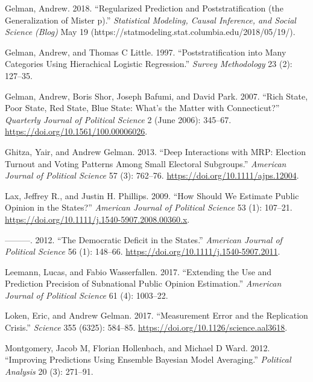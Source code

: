 \documentclass[
]{article}
\newlength{\cslhangindent}
\newenvironment{CSLReferences}[2] %
 {%
  \setlength{\parindent}{0pt}
  \ifodd #1 \everypar{\setlength{\hangindent}{\cslhangindent}}\ignorespaces\fi
  \ifnum #2 > 0
  \setlength{\parskip}{#2\baselineskip}
  \fi
 }%
 {}
\begin{document}
\begin{CSLReferences}{1}{0}
\leavevmode{}%
Gelman, Andrew. 2018. {``Regularized Prediction and Poststratification
(the Generalization of Mister p).''} \emph{Statistical Modeling, Causal
Inference, and Social Science (Blog)} May 19
(https://statmodeling.stat.columbia.edu/2018/05/19/).

\leavevmode{}%
Gelman, Andrew, and Thomas C Little. 1997. {``Poststratification into
Many Categories Using Hierachical Logistic Regression.''} \emph{Survey
Methodology} 23 (2): 127--35.

\leavevmode{}%
Gelman, Andrew, Boris Shor, Joseph Bafumi, and David Park. 2007. {``Rich
State, Poor State, Red State, Blue State: What's the Matter with
Connecticut?''} \emph{Quarterly Journal of Political Science} 2 (June
2006): 345--67. \url{https://doi.org/10.1561/100.00006026}.

\leavevmode{}%
Ghitza, Yair, and Andrew Gelman. 2013. {``Deep Interactions with MRP:
Election Turnout and Voting Patterns Among Small Electoral Subgroups.''}
\emph{American Journal of Political Science} 57 (3): 762--76.
\url{https://doi.org/10.1111/ajps.12004}.

\leavevmode{}%
Lax, Jeffrey R., and Justin H. Phillips. 2009. {``How Should We Estimate
Public Opinion in the States?''} \emph{American Journal of Political
Science} 53 (1): 107--21.
\url{https://doi.org/10.1111/j.1540-5907.2008.00360.x}.

\leavevmode{}%
---------. 2012. {``The Democratic Deficit in the States.''}
\emph{American Journal of Political Science} 56 (1): 148--66.
\url{https://doi.org/10.1111/j.1540-5907.2011}.

\leavevmode{}%
Leemann, Lucas, and Fabio Wasserfallen. 2017. {``Extending the Use and
Prediction Precision of Subnational Public Opinion Estimation.''}
\emph{American Journal of Political Science} 61 (4): 1003--22.

\leavevmode{}%
Loken, Eric, and Andrew Gelman. 2017. {``Measurement Error and the
Replication Crisis.''} \emph{Science} 355 (6325): 584--85.
\url{https://doi.org/10.1126/science.aal3618}.

\leavevmode{}%
Montgomery, Jacob M, Florian Hollenbach, and Michael D Ward. 2012.
{``Improving Predictions Using Ensemble Bayesian Model Averaging.''}
\emph{Political Analysis} 20 (3): 271--91.


\end{CSLReferences}
\end{document}
